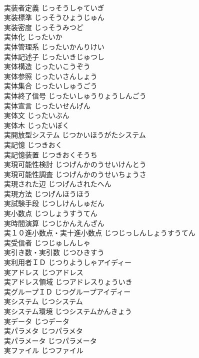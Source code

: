 \documentclass[8pt]{extreport}
\begin{document}
\begin{CJK}{UTF8}{min}
\\	実装者定義	じっそうしゃていぎ	
\\	実装標準	じっそうひょうじゅん	
\\	実装密度	じっそうみつど	
\\	実体化	じったいか	
\\	実体管理系	じったいかんりけい	
\\	実体記述子	じったいきじゅつし	
\\	実体構造	じったいこうぞう	
\\	実体参照	じったいさんしょう	
\\	実体集合	じったいしゅうごう	
\\	実体終了信号	じったいしゅうりょうしんごう	
\\	実体宣言	じったいせんげん	
\\	実体文	じったいぶん	
\\	実体木	じったいぼく	
\\	実開放型システム	じつかいほうがたシステム	
\\	実記憶	じつきおく	
\\	実記憶装置	じつきおくそうち	
\\	実現可能性検討	じつげんかのうせいけんとう	
\\	実現可能性調査	じつげんかのうせいちょうさ	
\\	実現された辺	じつげんされたへん	
\\	実現方法	じつげんほうほう	
\\	実試験手段	じつしけんしゅだん	
\\	実小数点	じつしょうすうてん	
\\	実時間演算	じつじかんえんざん	
\\	実１０進小数点・実十進小数点	じつじっしんしょうすうてん	
\\	実受信者	じつじゅしんしゃ	
\\	実引き数・実引数	じつひきすう	
\\	実利用者ＩＤ	じつりようしゃアイディー	
\\	実アドレス	じつアドレス	
\\	実アドレス領域	じつアドレスりょういき	
\\	実グループＩＤ	じつグループアイディー	
\\	実システム	じつシステム	
\\	実システム環境	じつシステムかんきょう	
\\	実データ	じつデータ	
\\	実パラメタ	じつパラメタ	
\\	実パラメータ	じつパラメータ	
\\	実ファイル	じつファイル	

\end{CJK}
\end{document}
